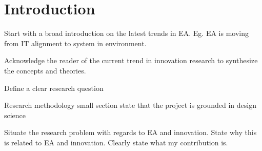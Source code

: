 
\chapter{Introduction} %

\label{Chapter1} %



Start with a broad introduction on the latest trends in EA. Eg. EA is moving from IT alignment to system in environment.

Acknowledge the reader of the current trend in innovation research to synthesize the concepts and theories.

Define a clear research question

Research methodology small section state that the project is grounded in design science

Situate the research problem with regards to EA and innovation.	
State why this is related to EA and innovation.
Clearly state what my contribution is.


